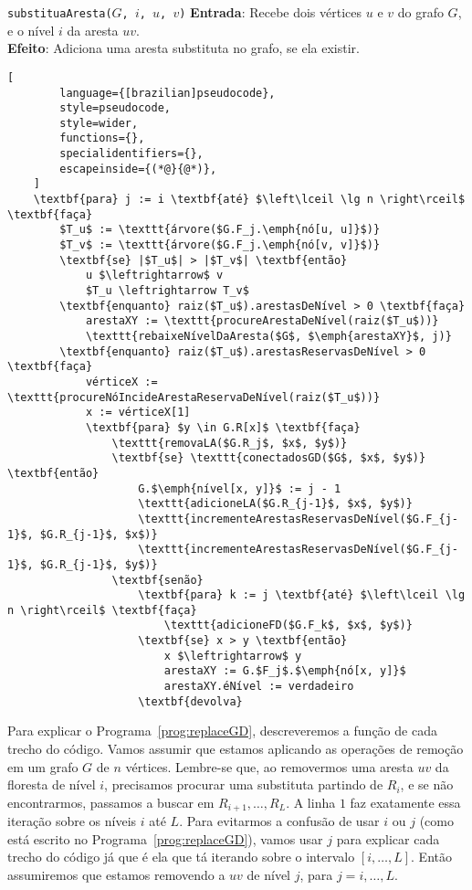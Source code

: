 \begin{programruledcaption}{\texttt{substituaAresta($G$, $i$, $u$, $v$)} \label{prog:replaceGD}}
    \noindent\textbf{Entrada}: Recebe dois vértices $u$ e $v$ do grafo $G$, e o nível $i$ da aresta $uv$. \\
    \noindent\textbf{Efeito}: Adiciona uma aresta substituta no grafo, se ela existir.
    \vspace{-0.5\baselineskip}
    \begin{lstlisting}[
        language={[brazilian]pseudocode},
        style=pseudocode,
        style=wider,
        functions={},
        specialidentifiers={},
        escapeinside={(*@}{@*)},
    ]
    \textbf{para} j := i \textbf{até} $\left\lceil \lg n \right\rceil$ \textbf{faça}
        $T_u$ := \texttt{árvore($G.F_j.\emph{nó[u, u]}$)}
        $T_v$ := \texttt{árvore($G.F_j.\emph{nó[v, v]}$)}    
        \textbf{se} |$T_u$| > |$T_v$| \textbf{então}
            u $\leftrightarrow$ v
            $T_u \leftrightarrow T_v$
        \textbf{enquanto} raiz($T_u$).arestasDeNível > 0 \textbf{faça} 
            arestaXY := \texttt{procureArestaDeNível(raiz($T_u$))}
            \texttt{rebaixeNívelDaAresta($G$, $\emph{arestaXY}$, j)}
        \textbf{enquanto} raiz($T_u$).arestasReservasDeNível > 0     \textbf{faça}
            vérticeX := \texttt{procureNóIncideArestaReservaDeNível(raiz($T_u$))}
            x := vérticeX[1]
            \textbf{para} $y \in G.R[x]$ \textbf{faça}
                \texttt{removaLA($G.R_j$, $x$, $y$)} 
                \textbf{se} \texttt{conectadosGD($G$, $x$, $y$)} \textbf{então} 
                    G.$\emph{nível[x, y]}$ := j - 1
                    \texttt{adicioneLA($G.R_{j-1}$, $x$, $y$)}
                    \texttt{incrementeArestasReservasDeNível($G.F_{j-1}$, $G.R_{j-1}$, $x$)}
                    \texttt{incrementeArestasReservasDeNível($G.F_{j-1}$, $G.R_{j-1}$, $y$)}
                \textbf{senão}
                    \textbf{para} k := j \textbf{até} $\left\lceil \lg n \right\rceil$ \textbf{faça}
                        \texttt{adicioneFD($G.F_k$, $x$, $y$)}
                    \textbf{se} x > y \textbf{então}
                        x $\leftrightarrow$ y
                        arestaXY := G.$F_j$.$\emph{nó[x, y]}$
                        arestaXY.éNível := verdadeiro
                    \textbf{devolva}
    \end{lstlisting}
    \vspace{-0.5\baselineskip}
\end{programruledcaption}

Para explicar o Programa~\ref{prog:replaceGD}, descreveremos a função de cada trecho do código. Vamos assumir que estamos aplicando as operações de remoção em um grafo $G$ de $n$ vértices. Lembre-se que, ao removermos uma aresta $uv$ da floresta de nível $i$, precisamos procurar uma substituta partindo de $R_i$, e se não encontrarmos, passamos a buscar em $R_{i + 1}, \ldots, R_L$. A linha $1$ faz exatamente essa iteração sobre os níveis $i$ até $L$. Para evitarmos a confusão de usar $i$ ou $j$ (como está escrito no Programa~\ref{prog:replaceGD}), vamos usar $j$ para explicar cada trecho do código já que é ela que tá iterando sobre o intervalo $[i, \ldots, L]$. Então assumiremos que estamos removendo a $uv$ de nível $j$, para $j = i, \ldots , L$.

